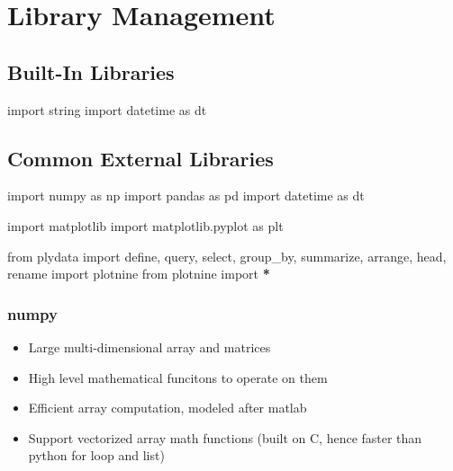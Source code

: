 \documentclass[
]{book}
\newenvironment{Shaded}{\begin{snugshade}}{\end{snugshade}}
\newcommand{\ImportTok}[1]{#1}
\newcommand{\NormalTok}[1]{#1}
\newcommand{\OperatorTok}[1]{\textcolor[rgb]{0.43,0.43,0.43}{\textbf{#1}}}
\providecommand{\tightlist}{%
  \setlength{\itemsep}{0pt}\setlength{\parskip}{0pt}}
\begin{document}
\hypertarget{library-management}{%
\section{Library Management}\label{library-management}}

\hypertarget{built-in-libraries}{%
\subsection{Built-In Libraries}\label{built-in-libraries}}

\begin{Shaded}
\begin{Highlighting}[]
\ImportTok{import}\NormalTok{ string}
\ImportTok{import}\NormalTok{ datetime }\ImportTok{as}\NormalTok{ dt}
\end{Highlighting}
\end{Shaded}

\hypertarget{common-external-libraries}{%
\subsection{Common External Libraries}\label{common-external-libraries}}

\begin{Shaded}
\begin{Highlighting}[]
\ImportTok{import}\NormalTok{ numpy }\ImportTok{as}\NormalTok{ np}
\ImportTok{import}\NormalTok{ pandas }\ImportTok{as}\NormalTok{ pd}
\ImportTok{import}\NormalTok{ datetime }\ImportTok{as}\NormalTok{ dt}

\ImportTok{import}\NormalTok{ matplotlib}
\ImportTok{import}\NormalTok{ matplotlib.pyplot }\ImportTok{as}\NormalTok{ plt}

\ImportTok{from}\NormalTok{ plydata }\ImportTok{import}\NormalTok{ define, query, select, group_by, summarize, arrange, head, rename}
\ImportTok{import}\NormalTok{ plotnine}
\ImportTok{from}\NormalTok{ plotnine }\ImportTok{import} \OperatorTok{*}
\end{Highlighting}
\end{Shaded}

\hypertarget{numpy}{%
\subsubsection{numpy}\label{numpy}}

\begin{itemize}
\tightlist
\item
  Large multi-dimensional array and matrices\\
\item
  High level mathematical funcitons to operate on them
\item
  Efficient array computation, modeled after matlab\\
\item
  Support vectorized array math functions (built on C, hence faster than python for loop and list)
\end{itemize}
\end{document}
